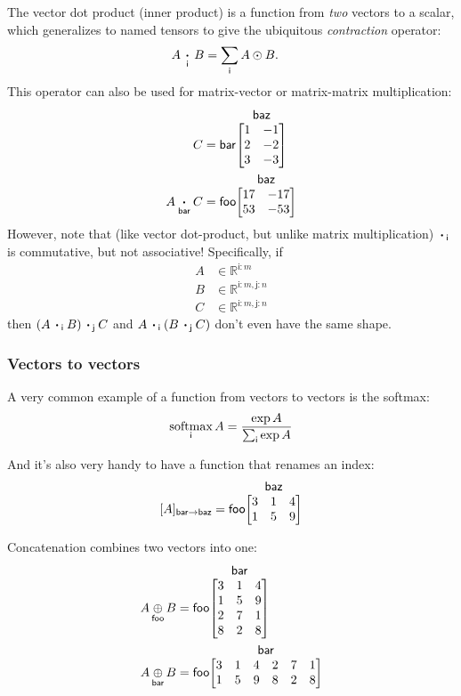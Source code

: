 \documentclass{article}
\makeatletter
\newcommand{\name}[1]{\mathsf{#1}}
\newcommand{\ndot}[1]{\mathbin{\mathop{\thinspace\boldsymbol\cdot\thinspace}\displaylimits_{\name{#1}}}}
\newcommand{\nsum}[1]{\mathop{\sum}_{\name{#1}}}
\newcommand{\nfun}[2]{\mathop{\text{#2}}\displaylimits_{\name{#1}}}
\newcommand{\nmatrix}[3]{\name{#1}\begin{array}[b]{@{}c@{}}\name{#2}\\\begin{bmatrix}#3\end{bmatrix}\end{array}}
\makeatother
\begin{document}
The vector dot product (inner product) is a function from \emph{two} vectors to a scalar, which generalizes to named tensors to give the ubiquitous \emph{contraction} operator:
\begin{align*}
  A \ndot{i} B &= \nsum{i} A \odot B.
\end{align*}
This operator can also be used for matrix-vector or matrix-matrix multiplication:
\begin{align*}
C &= \nmatrix{bar}{baz}{
  1 & -1 \\ 2 & -2 \\ 3 & -3
} \\
A \ndot{bar} C &= \nmatrix{foo}{baz}{
  17 & -17 \\
  53 & -53
}
\end{align*}
However, note that (like vector dot-product, but unlike matrix multiplication) $\ndot{i}$ is commutative, but not associative! Specifically, if
\begin{align*}
A &\in \mathbb{R}^{\name{i}:m} \\
B &\in \mathbb{R}^{\name{i}:m,\name{j}:n} \\
C &\in \mathbb{R}^{\name{i}:m,\name{j}:n}
\end{align*}
then $(A \ndot{i} B) \ndot{j} C$ and $A \ndot{i} (B \ndot{j} C)$ don't even have the same shape.

\subsubsection{Vectors to vectors}

A very common example of a function from vectors to vectors is the softmax:
\begin{equation*}
  \nfun{i}{softmax} A = \frac{\exp A}{\nsum{i} \exp A}
\end{equation*}

And it's also very handy to have a function that renames an index:
\begin{equation*}
[A]_{\name{bar}\rightarrow\name{baz}} = \nmatrix{foo}{baz}{
  3 & 1 & 4 \\
  1 & 5 & 9
}
\end{equation*}

Concatenation combines two vectors into one:
\begin{align*}
  A \nfun{foo}{$\oplus$} B &= \nmatrix{foo}{bar}{
    3 & 1 & 4 \\
    1 & 5 & 9 \\
    2 & 7 & 1 \\
    8 & 2 & 8
  } \\
  A \nfun{bar}{$\oplus$} B &= \nmatrix{foo}{bar}{
    3 & 1 & 4 & 2 & 7 & 1 \\
    1 & 5 & 9 & 8 & 2 & 8
  }
\end{align*}
\end{document}
